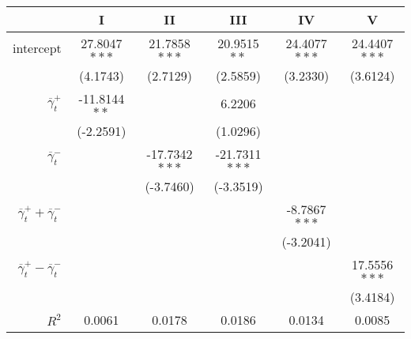 \begin{tabular}{rSSSSS}
\toprule
{} &             I &             II &            III &            IV &             V \\
\midrule
intercept &  27.8047$***$ &   21.7858$***$ &    20.9515$**$ &  24.4077$***$ &  24.4407$***$ \\
          &      (4.1743) &       (2.7129) &       (2.5859) &      (3.2330) &      (3.6124) \\
$\overline \gamma^+_t$       &  -11.8144$**$ &                &         6.2206 &               &               \\
          &     (-2.2591) &                &       (1.0296) &               &               \\
$\overline \gamma^-_t$       &               &  -17.7342$***$ &  -21.7311$***$ &               &               \\
          &               &      (-3.7460) &      (-3.3519) &               &               \\
$\overline \gamma^+_t + \overline \gamma^-_t$   &               &                &                &  -8.7867$***$ &               \\
          &               &                &                &     (-3.2041) &               \\
$\overline \gamma^+_t - \overline \gamma^-_t$  &               &                &                &               &  17.5556$***$ \\
          &               &                &                &               &      (3.4184) \\
\midrule
$R^2$ & 0.0061 & 0.0178 & 0.0186 & 0.0134 & 0.0085\\\bottomrule
\end{tabular}
